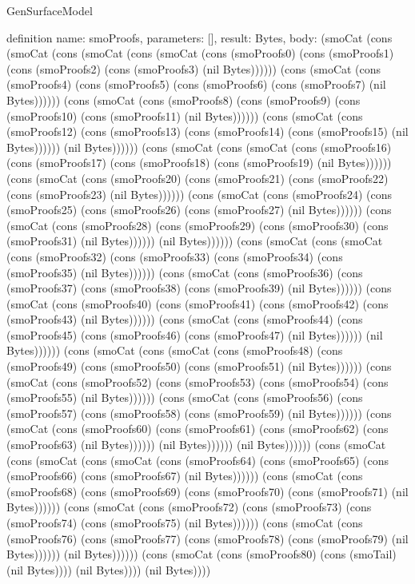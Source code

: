 \begin{lexlean}{GenSurfaceModel}
\begin{semanticmodule}
definition{
  name: smoProofs,
  parameters: [],
  result: Bytes,
  body: (smoCat (cons (smoCat (cons (smoCat (cons (smoCat (cons (smoProofs0) (cons (smoProofs1) (cons (smoProofs2) (cons (smoProofs3) (nil Bytes)))))) (cons (smoCat (cons (smoProofs4) (cons (smoProofs5) (cons (smoProofs6) (cons (smoProofs7) (nil Bytes)))))) (cons (smoCat (cons (smoProofs8) (cons (smoProofs9) (cons (smoProofs10) (cons (smoProofs11) (nil Bytes)))))) (cons (smoCat (cons (smoProofs12) (cons (smoProofs13) (cons (smoProofs14) (cons (smoProofs15) (nil Bytes)))))) (nil Bytes)))))) (cons (smoCat (cons (smoCat (cons (smoProofs16) (cons (smoProofs17) (cons (smoProofs18) (cons (smoProofs19) (nil Bytes)))))) (cons (smoCat (cons (smoProofs20) (cons (smoProofs21) (cons (smoProofs22) (cons (smoProofs23) (nil Bytes)))))) (cons (smoCat (cons (smoProofs24) (cons (smoProofs25) (cons (smoProofs26) (cons (smoProofs27) (nil Bytes)))))) (cons (smoCat (cons (smoProofs28) (cons (smoProofs29) (cons (smoProofs30) (cons (smoProofs31) (nil Bytes)))))) (nil Bytes)))))) (cons (smoCat (cons (smoCat (cons (smoProofs32) (cons (smoProofs33) (cons (smoProofs34) (cons (smoProofs35) (nil Bytes)))))) (cons (smoCat (cons (smoProofs36) (cons (smoProofs37) (cons (smoProofs38) (cons (smoProofs39) (nil Bytes)))))) (cons (smoCat (cons (smoProofs40) (cons (smoProofs41) (cons (smoProofs42) (cons (smoProofs43) (nil Bytes)))))) (cons (smoCat (cons (smoProofs44) (cons (smoProofs45) (cons (smoProofs46) (cons (smoProofs47) (nil Bytes)))))) (nil Bytes)))))) (cons (smoCat (cons (smoCat (cons (smoProofs48) (cons (smoProofs49) (cons (smoProofs50) (cons (smoProofs51) (nil Bytes)))))) (cons (smoCat (cons (smoProofs52) (cons (smoProofs53) (cons (smoProofs54) (cons (smoProofs55) (nil Bytes)))))) (cons (smoCat (cons (smoProofs56) (cons (smoProofs57) (cons (smoProofs58) (cons (smoProofs59) (nil Bytes)))))) (cons (smoCat (cons (smoProofs60) (cons (smoProofs61) (cons (smoProofs62) (cons (smoProofs63) (nil Bytes)))))) (nil Bytes)))))) (nil Bytes)))))) (cons (smoCat (cons (smoCat (cons (smoCat (cons (smoProofs64) (cons (smoProofs65) (cons (smoProofs66) (cons (smoProofs67) (nil Bytes)))))) (cons (smoCat (cons (smoProofs68) (cons (smoProofs69) (cons (smoProofs70) (cons (smoProofs71) (nil Bytes)))))) (cons (smoCat (cons (smoProofs72) (cons (smoProofs73) (cons (smoProofs74) (cons (smoProofs75) (nil Bytes)))))) (cons (smoCat (cons (smoProofs76) (cons (smoProofs77) (cons (smoProofs78) (cons (smoProofs79) (nil Bytes)))))) (nil Bytes)))))) (cons (smoCat (cons (smoProofs80) (cons (smoTail) (nil Bytes)))) (nil Bytes)))) (nil Bytes))))
}


\end{semanticmodule}
\end{lexlean}
